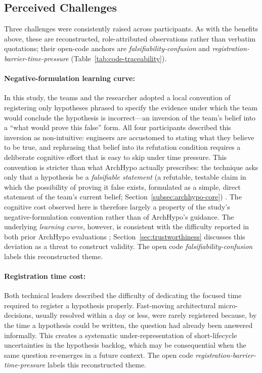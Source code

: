 \subsection{Perceived Challenges}
\label{subsec:challenges}

Three challenges were consistently raised across participants. As with the
benefits above, these are reconstructed, role-attributed observations rather
than verbatim quotations; their open-code anchors are
\textit{falsifiability-confusion} and
\textit{registration-barrier-time-pressure}
(Table~\ref{tab:code-traceability}).

\paragraph{Negative-formulation learning curve:}
In this study, the teams and the researcher adopted a local convention of
registering only hypotheses phrased to specify the evidence under which the team
would conclude the hypothesis is incorrect---an inversion of the team's belief
into a ``what would prove this false'' form. All four participants described this
inversion as non-intuitive: engineers are accustomed to stating what they believe
to be true, and rephrasing that belief into its refutation condition requires a
deliberate cognitive effort that is easy to skip under time pressure. This
convention is stricter than what ArchHypo actually prescribes: the technique asks
only that a hypothesis be a \emph{falsifiable statement} (a refutable, testable
claim in which the possibility of proving it false exists, formulated as a simple,
direct statement of the team's current belief; Section~\ref{subsec:archhypo-core})
\citep{silva2024tse}. The cognitive cost observed here is therefore largely a
property of the study's negative-formulation convention rather than of ArchHypo's
guidance. The underlying \emph{learning curve}, however, is consistent with the
difficulty reported in both prior ArchHypo evaluations \citep{silva2024tse,
silva2024ieeesw}; Section~\ref{sec:trustworthiness} discusses this deviation as a
threat to construct validity. The open code
\textit{falsifiability-confusion} labels this reconstructed theme.

\paragraph{Registration time cost:}
Both technical leaders described the difficulty of dedicating the focused time
required to register a hypothesis properly. Fast-moving architectural micro-decisions, 
usually resolved within a day or less, were rarely registered because, by the time a
hypothesis could be written, the question had already been answered informally.
This creates a systematic under-representation of short-lifecycle uncertainties
in the hypothesis backlog, which may be consequential when the same question
re-emerges in a future context. The open code
\textit{registration-barrier-time-pressure} labels this reconstructed theme.

